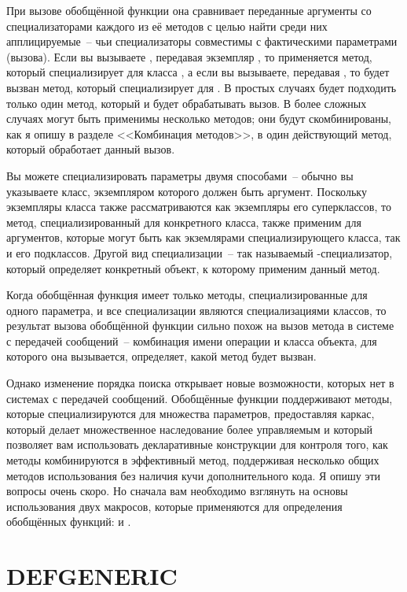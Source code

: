 При вызове обобщённой функции она сравнивает переданные аргументы со специализаторами
каждого из её методов с целью найти среди них апплицируемые~-- чьи специализаторы
совместимы с фактическими параметрами (вызова). Если вы вызываете , передавая
экземпляр , то применяется метод, который специализирует  для
класса , а если вы вызываете, передавая , то будет вызван
метод, который специализирует  для .  В простых случаях будет
подходить только один метод, который и будет обрабатывать вызов.  В более сложных случаях
могут быть применимы несколько методов; они будут скомбинированы, как я опишу в разделе
<<Комбинация методов>>, в один действующий метод, который обработает данный вызов.

Вы можете специализировать параметры двумя способами~-- обычно вы указываете класс,
экземпляром которого должен быть аргумент.  Поскольку экземпляры класса также
рассматриваются как экземпляры его суперклассов, то метод, специализированный для
конкретного класса, также применим для аргументов, которые могут быть как экземлярами
специализирующего класса, так и его подклассов.  Другой вид специализации~-- так
называемый -специализатор, который определяет конкретный объект, к которому
применим данный метод.

Когда обобщённая функция имеет только методы, специализированные для одного параметра, и
все специализации являются специализациями классов, то результат вызова обобщённой функции
сильно похож на вызов метода в системе с передачей сообщений~-- комбинация имени операции
и класса объекта, для которого она вызывается, определяет, какой метод будет вызван.

Однако изменение порядка поиска открывает новые возможности, которых нет в системах с
передачей сообщений.  Обобщённые функции поддерживают методы, которые специализируются для
множества параметров, предоставляя каркас, который делает множественное наследование более
управляемым и который позволяет вам использовать декларативные конструкции для контроля
того, как методы комбинируются в эффективный метод, поддерживая несколько общих методов
использования без наличия кучи дополнительного кода. Я опишу эти вопросы очень скоро.  Но
сначала вам необходимо взглянуть на основы использования двух макросов, которые
применяются для определения обобщённых функций:  и .

\section{DEFGENERIC}

